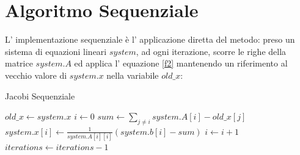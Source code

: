 \documentclass[twocolumn]{article}
\begin{document}
	\section{Algoritmo Sequenziale}
	L' implementazione sequenziale è l' applicazione diretta del metodo: preso un sistema di equazioni lineari $system$, ad ogni iterazione, scorre le righe della matrice $system.A$  ed applica l' equazione \eqref{f2} mantenendo un riferimento al vecchio valore di $system.x$ nella variabile $old\_x$:
	\begin{algorithm}
		\footnotesize
		\caption{Jacobi Sequenziale}
		\begin{algorithmic}[1]
				\State $old\_x \gets system.x$
				\State $i \gets 0$
				\State $sum \gets \sum_{j\neq i} system.A[i] - old\_x[j]$%
				\State $system.x[i] \gets \frac{1}{system.A[i][i]}(system.b[i] - sum)$
				\State $i \gets i + 1$
				\EndWhile
				\State $iterations \gets iterations - 1$
				\EndWhile
			\EndFunction
		\end{algorithmic}
	\end{algorithm}
\end{document}
